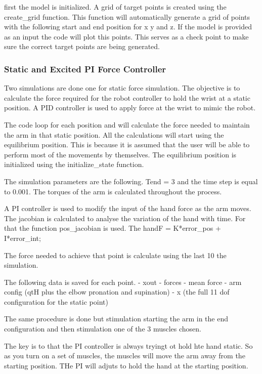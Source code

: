 first the model is initialized.
A grid of target points is created using the create\_grid function.
This function will automatically generate a grid of points with the following start
and end position for x y and z. If the model is provided as an input the code will 
plot this points. This serves as a check point to make sure the correct target points
are being generated.


\subsubsection{Static and Excited PI Force Controller}
Two simulations are done one for static force simulation. The objective is to calculate the force required for the robot controller to hold the wrist at a static position. A PID controller is used to apply force at the wrist to mimic the robot. 

The code loop for each position and will calculate the force needed to maintain the arm
in that static position. All the calculations will start using the equilibrium position.
This is because it is assumed that the user will be able to perform most of the movements
by themselves. The equilibrium position is initialized using the initialize\_state function.

The simulation parameters are the following. Tend = 3 and the time step is equal to 0.001.
The torques of the arm is calculated throughout the process.

A PI controller is used to modify the input of the hand force as the arm moves.
The jacobian is calculated to analyse the variation of the hand with time. For that the 
function pos\_jacobian is used. 
The handF = K*error\_pos + I*error\_int;

The force needed to achieve that point is calculate using the last 10%
the simulation.

The following data is saved for each point.
- xout
- forces
- mean force
- arm config (qtH plus the elbow pronation and supination)
- x (the full 11 dof configuration for the static point)

The same procedure is done but stimulation starting the arm in the end configuration
and then stimulation one of the 3 muscles chosen.

The key is to that the PI controller is always tryingt ot hold hte hand static. So as you turn on a set of muscles, the muscles will move the arm away from the starting position. THe PI will adjuts to hold the hand at the starting position. 

